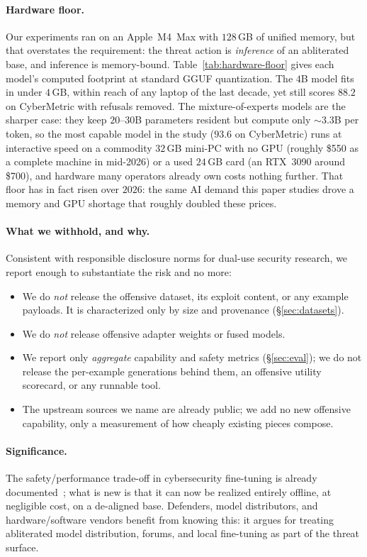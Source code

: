 \paragraph{Hardware floor.}
Our experiments ran on an Apple~M4~Max with $128$\,GB of unified memory, but
that overstates the requirement: the threat action is \emph{inference} of an
abliterated base, and inference is memory-bound. Table~\ref{tab:hardware-floor}
gives each model's computed footprint at standard GGUF quantization. The $4$B
model fits in under $4$\,GB, within reach of any laptop of the last decade, yet still scores $88.2$ on CyberMetric with refusals removed. The
mixture-of-experts models are the sharper case: they keep $20$--$30$B
parameters resident but compute only ${\sim}3.3$B per token, so the most
capable model in the study ($93.6$ on CyberMetric) runs at interactive speed on
a commodity $32$\,GB mini-PC with no GPU (roughly \$550 as a complete machine in
mid-2026) or a used $24$\,GB card (an RTX~3090 around \$700), and hardware many
operators already own costs nothing further. That floor has in fact risen over $2026$: the same AI demand this paper studies
drove a memory and GPU shortage that roughly doubled these prices.

\paragraph{What we withhold, and why.}
Consistent with responsible disclosure norms for dual-use security research, we
report enough to substantiate the risk and no more:
\begin{itemize}
  \item We do \emph{not} release the offensive dataset, its exploit content, or
  any example payloads. It is characterized only by size and provenance
  (\S\ref{sec:datasets}).
  \item We do \emph{not} release offensive adapter weights or fused models.
  \item We report only \emph{aggregate} capability and safety metrics
  (\S\ref{sec:eval}); we do not release the per-example generations behind
  them, an offensive utility scorecard, or any runnable tool.
  \item The upstream sources we name are already public; we add no new
  offensive capability, only a measurement of how cheaply existing pieces
  compose.
\end{itemize}

\paragraph{Significance.}
The safety/performance trade-off in cybersecurity fine-tuning is already
documented~\cite{cyberllminstruct,qi2023finetuning,lermen2023lora}; what is new
is that it can now be realized entirely offline, at negligible cost, on a
de-aligned base. Defenders, model distributors, and hardware/software vendors
benefit from knowing this: it argues for treating abliterated model
distribution, forums, and local fine-tuning as part of the threat surface.
